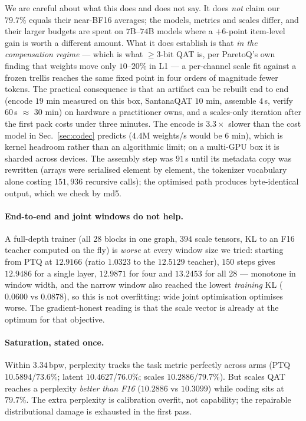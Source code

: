\documentclass[11pt,a4paper]{article}
\newcommand{\bpw}{\,\mathrm{bpw}}
\begin{document}
We are careful about what this does and does not say. It does \emph{not} claim our $79.7\%$ equals
their near-BF16 averages; the models, metrics and scales differ, and their larger budgets are spent
on $7$B--$74$B models where a $+6$-point item-level gain is worth a different amount. What it does
establish is that \emph{in the compensation regime} --- which is what $\ge3$-bit QAT is, per
ParetoQ's own finding that weights move only $10$--$20\%$ in L1 --- a per-channel scale fit against
a frozen trellis reaches the same fixed point in four orders of magnitude fewer tokens. The
practical consequence is that an artifact can be rebuilt end to end (encode $19$ min measured on
this box, SantanaQAT $10$ min, assemble $4$\,s, verify $60$\,s $\approx$ $30$ min) on hardware a practitioner
owns, and a scales-only iteration after the first pack costs under three minutes. The encode is
$3.3\times$ slower than the cost model in Sec.~\ref{sec:codec} predicts ($4.4$M weights/s would be
$6$ min), which is kernel headroom rather than an algorithmic limit; on a multi-GPU box it is sharded
across devices. The assembly step was $91$\,s
until its metadata copy was rewritten (arrays were serialised element by element, the tokenizer
vocabulary alone costing $151{,}936$ recursive calls); the optimised path produces byte-identical
output, which we check by md5.

\paragraph{End-to-end and joint windows do not help.} A full-depth trainer (all 28 blocks in one
graph, $394$ scale tensors, KL to an F16 teacher computed on the fly) is \emph{worse} at every
window size we tried: starting from PTQ at $12.9166$ (ratio $1.0323$ to the $12.5129$ teacher),
$150$ steps gives $12.9486$ for a single layer, $12.9871$ for four and $13.2453$ for all 28 ---
monotone in window width, and the narrow window also reached the lowest \emph{training} KL
($0.0600$ vs $0.0878$), so this is not overfitting: wide joint optimisation optimises worse. The
gradient-honest reading is that the scale vector is already at the optimum for that objective.

\paragraph{Saturation, stated once.} Within $3.34\bpw$, perplexity tracks the task metric perfectly
across arms (PTQ $10.5894$/$73.6\%$; latent $10.4627$/$76.0\%$; scales $10.2886$/$79.7\%$). But
scales QAT reaches a perplexity \emph{better than F16} ($10.2886$ vs $10.3099$) while coding sits
at $79.7\%$. The extra perplexity is calibration overfit, not capability; the repairable
distributional damage is exhausted in the first pass.
\end{document}
